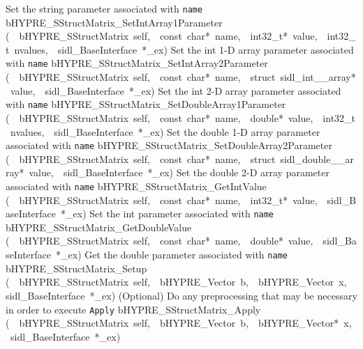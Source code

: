 \documentclass{article}
\begin{document}
\begin{cxxentry}
\begin{cxxentry}
\begin{cxxnames}
        {
Set the string parameter associated with {\tt name}}
        {}
\label{cxx.4.5.25}
        {bHYPRE\_SStructMatrix\_SetIntArray1Parameter}
        {(\ \ bHYPRE\_SStructMatrix\ self,\ \ const\ char*\ name,\ \ int32\_t*\ value,\ \ int32\_t\ nvalues,\ \ sidl\_BaseInterface\ *\_ex)}
        {
Set the int 1-D array parameter associated with {\tt name}}
        {}
\label{cxx.4.5.26}
        {bHYPRE\_SStructMatrix\_SetIntArray2Parameter}
        {(\ \ bHYPRE\_SStructMatrix\ self,\ \ const\ char*\ name,\ \ struct\ sidl\_int\_\_array*\ value,\ \ sidl\_BaseInterface\ *\_ex)}
        {
Set the int 2-D array parameter associated with {\tt name}}
        {}
\label{cxx.4.5.27}
        {bHYPRE\_SStructMatrix\_SetDoubleArray1Parameter}
        {(\ \ bHYPRE\_SStructMatrix\ self,\ \ const\ char*\ name,\ \ double*\ value,\ \ int32\_t\ nvalues,\ \ sidl\_BaseInterface\ *\_ex)}
        {
Set the double 1-D array parameter associated with {\tt name}}
        {}
\label{cxx.4.5.28}
        {bHYPRE\_SStructMatrix\_SetDoubleArray2Parameter}
        {(\ \ bHYPRE\_SStructMatrix\ self,\ \ const\ char*\ name,\ \ struct\ sidl\_double\_\_array*\ value,\ \ sidl\_BaseInterface\ *\_ex)}
        {
Set the double 2-D array parameter associated with {\tt name}}
        {}
\label{cxx.4.5.29}
        {bHYPRE\_SStructMatrix\_GetIntValue}
        {(\ \ bHYPRE\_SStructMatrix\ self,\ \ const\ char*\ name,\ \ int32\_t*\ value,\ \ sidl\_BaseInterface\ *\_ex)}
        {
Set the int parameter associated with {\tt name}}
        {}
\label{cxx.4.5.30}
        {bHYPRE\_SStructMatrix\_GetDoubleValue}
        {(\ \ bHYPRE\_SStructMatrix\ self,\ \ const\ char*\ name,\ \ double*\ value,\ \ sidl\_BaseInterface\ *\_ex)}
        {
Get the double parameter associated with {\tt name}}
        {}
\label{cxx.4.5.31}
        {bHYPRE\_SStructMatrix\_Setup}
        {(\ \ bHYPRE\_SStructMatrix\ self,\ \ bHYPRE\_Vector\ b,\ \ bHYPRE\_Vector\ x,\ \ sidl\_BaseInterface\ *\_ex)}
        {
(Optional) Do any preprocessing that may be necessary in
order to execute {\tt Apply}}
        {}
\label{cxx.4.5.32}
        {bHYPRE\_SStructMatrix\_Apply}
        {(\ \ bHYPRE\_SStructMatrix\ self,\ \ bHYPRE\_Vector\ b,\ \ bHYPRE\_Vector*\ x,\ \ sidl\_BaseInterface\ *\_ex)}

\end{cxxnames}
\end{cxxentry}
\end{cxxentry}
\end{document}
